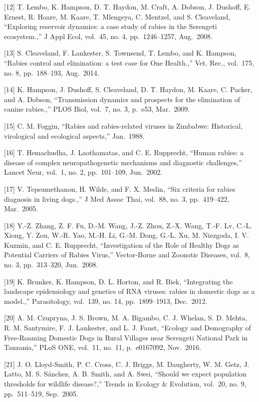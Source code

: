 \documentclass[
  oneside]{book}
\begin{document}
{[}12{]} T. Lembo, K. Hampson, D. T. Haydon, M. Craft, A. Dobson, J. Dushoff, E. Ernest, R. Hoare, M. Kaare, T. Mlengeya, C. Mentzel, and S. Cleaveland, ``Exploring reservoir dynamics: a case study of rabies in the Serengeti ecosystem.,'' J Appl Ecol, vol.~45, no. 4, pp.~1246--1257, Aug.~2008.

{[}13{]} S. Cleaveland, F. Lankester, S. Townsend, T. Lembo, and K. Hampson, ``Rabies control and elimination: a test case for One Health.,'' Vet. Rec., vol.~175, no. 8, pp.~188--193, Aug.~2014.

{[}14{]} K. Hampson, J. Dushoff, S. Cleaveland, D. T. Haydon, M. Kaare, C. Packer, and A. Dobson, ``Transmission dynamics and prospects for the elimination of canine rabies.,'' PLOS Biol, vol.~7, no. 3, p.~e53, Mar.~2009.

{[}15{]} C. M. Foggin, ``Rabies and rabies-related viruses in Zimbabwe: Historical, virological and ecological aspects,'' Jan.~1988.

{[}16{]} T. Hemachudha, J. Laothamatas, and C. E. Rupprecht, ``Human rabies: a disease of complex neuropathogenetic mechanisms and diagnostic challenges,'' Lancet Neur, vol.~1, no. 2, pp.~101--109, Jun.~2002.

{[}17{]} V. Tepsumethanon, H. Wilde, and F. X. Meslin, ``Six criteria for rabies diagnosis in living dogs.,'' J Med Assoc Thai, vol.~88, no. 3, pp.~419--422, Mar.~2005.

{[}18{]} Y.-Z. Zhang, Z. F. Fu, D.-M. Wang, J.-Z. Zhou, Z.-X. Wang, T.-F. Lv, C.-L. Xiong, Y. Zou, W.-R. Yao, M.-H. Li, G.-M. Dong, G.-L. Xu, M. Niezgoda, I. V. Kuzmin, and C. E. Rupprecht, ``Investigation of the Role of Healthy Dogs as Potential Carriers of Rabies Virus,'' Vector-Borne and Zoonotic Diseases, vol.~8, no. 3, pp.~313--320, Jun.~2008.

{[}19{]} K. Brunker, K. Hampson, D. L. Horton, and R. Biek, ``Integrating the landscape epidemiology and genetics of RNA viruses: rabies in domestic dogs as a model.,'' Parasitology, vol.~139, no. 14, pp.~1899--1913, Dec.~2012.

{[}20{]} A. M. Czupryna, J. S. Brown, M. A. Bigambo, C. J. Whelan, S. D. Mehta, R. M. Santymire, F. J. Lankester, and L. J. Faust, ``Ecology and Demography of Free-Roaming Domestic Dogs in Rural Villages near Serengeti National Park in Tanzania,'' PLoS ONE, vol.~11, no. 11, p.~e0167092, Nov.~2016.

{[}21{]} J. O. Lloyd-Smith, P. C. Cross, C. J. Briggs, M. Daugherty, W. M. Getz, J. Latto, M. S. Sánchez, A. B. Smith, and A. Swei, ``Should we expect population thresholds for wildlife disease?,'' Trends in Ecology \& Evolution, vol.~20, no. 9, pp.~511--519, Sep.~2005.
\end{document}
